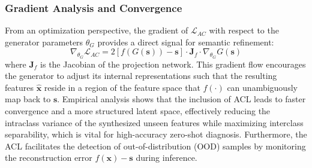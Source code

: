 \subsubsection{Gradient Analysis and Convergence}
From an optimization perspective, the gradient of $\mathcal{L}_{AC}$ with respect to the generator parameters $\theta_G$ provides a direct signal for semantic refinement:
\begin{equation}
\nabla_{\theta_G} \mathcal{L}_{AC} = 2 [f(G(\mathbf{s})) - \mathbf{s}] \cdot \mathbf{J}_f \cdot \nabla_{\theta_G} G(\mathbf{s})
\end{equation}
where $\mathbf{J}_f$ is the Jacobian of the projection network. This gradient flow encourages the generator to adjust its internal representations such that the resulting features $\hat{\mathbf{x}}$ reside in a region of the feature space that $f(\cdot)$ can unambiguously map back to $\mathbf{s}$. Empirical analysis shows that the inclusion of ACL leads to faster convergence and a more structured latent space, effectively reducing the intraclass variance of the synthesized unseen features while maximizing interclass separability, which is vital for high-accuracy zero-shot diagnosis. Furthermore, the ACL facilitates the detection of out-of-distribution (OOD) samples by monitoring the reconstruction error $f(\mathbf{x}) - \mathbf{s}$ during inference.
